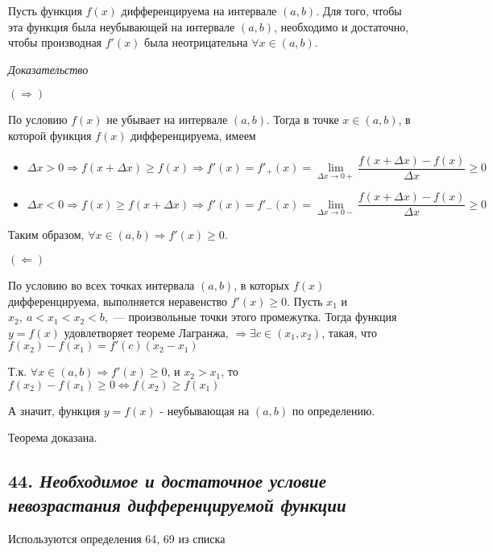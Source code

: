 Пусть функция $f(x)$ дифференцируема на интервале $(a, b)$. Для того, чтобы эта функция была неубывающей на интервале $(a, b)$, необходимо и достаточно, чтобы производная $f'(x)$ была неотрицательна $\forall x \in (a, b).$
\vspace*{20pt} 

\textit{Доказательство}

$(\Rightarrow)$

По условию $f(x)$ не убывает на интервале $(a, b)$. Тогда в точке $x \in (a, b)$, в которой функция $f(x)$ дифференцируема, имеем
\begin{itemize}

\item $\Delta x > 0\Rightarrow
f(x + \Delta x) \geqslant  f(x)
\Rightarrow f'(x) = f'_+(x) = \lim\limits_{\Delta x \to 0+ }{\dfrac{f(x + \Delta x) - f(x)}{\Delta x}} \geqslant 0$
\item $\Delta x < 0\Rightarrow
f(x)  \geqslant f(x + \Delta x)
\Rightarrow f'(x) = f'_-(x) = \lim\limits_{\Delta x \to 0-}{\dfrac{f(x + \Delta x) - f(x)}{\Delta x}} \geqslant 0$

\end{itemize}

Таким образом, $\forall x \in (a, b) \Rightarrow f'(x) \geqslant 0$.

$(\Leftarrow)$

По условию во всех точках интервала $(a,b)$, в которых $f(x)$ дифференцируема, выполняется неравенство $f'(x) \geqslant 0$. Пусть $x_1$ и $x_2,\ a < x_1 < x_2 < b,$ — произвольные точки этого промежутка. Тогда функция $y = f(x)$ удовлетворяет теореме Лагранжа, $\Rightarrow  \exists c \in (x_1, x_2)$, такая, что $f(x_2) - f(x_1) = f'(c)(x_2 - x_1)$

Т.к. $\forall x \in (a, b) \Rightarrow f'(x) \geqslant 0$, и $x_2 > x_1$, то $f(x_2) - f(x_1) \geqslant 0 \iff f(x_2) \geqslant  f(x_1) $

А значит, функция $y = f(x)$ - неубывающая на $(a, b)$ по определению.

Теорема доказана.
\newpage 
\subsection*{44. \textit{Необходимое и достаточное условие невозрастания дифференцируемой функции}}
\begin{Quote2} 
\small\centering 

Используются определения 64, 69 из списка \end{Quote2} 

